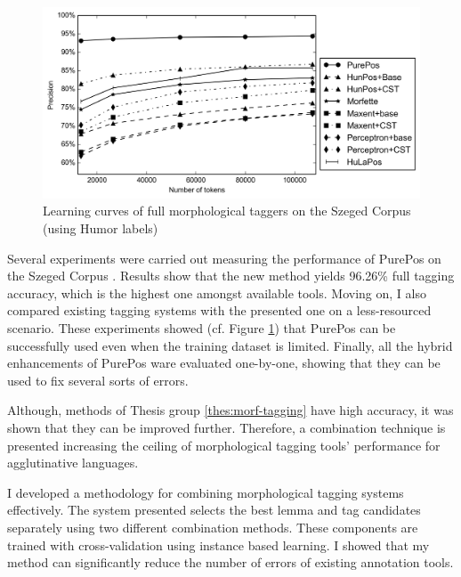 \begin{figure}[H]
  \centering
  \includegraphics[width=1\textwidth]{MorphTagging/msd_token.png}
  \caption{Learning curves of full morphological taggers on the Szeged Corpus (using Humor labels)}
  \label{fig:humor-token_en}
\end{figure}

Several experiments were carried out measuring the performance of PurePos on the Szeged Corpus \cite{Csendes2004}.
Results show that the new method yields 96.26\% full tagging accuracy, which is the highest one amongst available tools.
Moving on, I also compared existing tagging systems with the presented one on a less-resourced scenario.
These experiments showed (cf. Figure \ref{fig:humor-token_en}) that PurePos can be successfully used even when the training dataset is limited.
Finally, all the hybrid enhancements of PurePos ware evaluated one-by-one, showing that they can be used to fix several sorts of errors.


\thesisline%

Although, methods of Thesis group \ref{thes:morf-tagging} have high accuracy, it was shown that they can be improved further.  
Therefore, a combination technique is presented increasing the ceiling of morphological tagging tools' performance for agglutinative languages.


\begin{core}
\begin{thesis}
I developed a methodology for combining morphological tagging systems effectively.
The system presented selects the best lemma and tag candidates separately using two different combination methods.
These components are trained with cross-validation using instance based learning.
I showed that my method can significantly reduce the number of errors of existing annotation tools.
\end{thesis}

\begin{pub}
\cite{Laki2013a,Orosz2013c,Orosz2013d} 
\end{pub}
\end{core}


